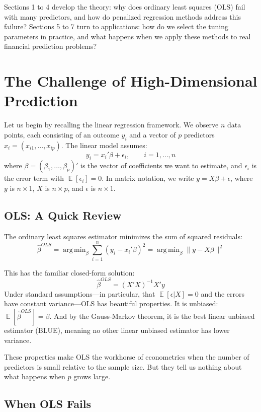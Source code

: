 \documentclass[11pt,a4paper]{article}
\DeclareMathOperator*{\argmin}{arg\,min}
\DeclareMathOperator{\E}{\mathbb{E}}
\begin{document}
Sections 1 to 4 develop the theory: why does ordinary least squares (OLS) fail with many predictors, and how do penalized regression methods address this failure? Sections 5 to 7 turn to applications: how do we select the tuning parameters in practice, and what happens when we apply these methods to real financial prediction problems?

\section{The Challenge of High-Dimensional Prediction}

Let us begin by recalling the linear regression framework. We observe $n$ data points, each consisting of an outcome $y_i$ and a vector of $p$ predictors $x_i = (x_{i1}, \ldots, x_{ip})$. The linear model assumes:
\[
y_i = x_i'\beta + \epsilon_i, \qquad i = 1, \ldots, n
\]
where $\beta = (\beta_1, \ldots, \beta_p)'$ is the vector of coefficients we want to estimate, and $\epsilon_i$ is the error term with $\E[\epsilon_i] = 0$. In matrix notation, we write $y = X\beta + \epsilon$, where $y$ is $n \times 1$, $X$ is $n \times p$, and $\epsilon$ is $n \times 1$.

\subsection{OLS: A Quick Review}

The ordinary least squares estimator minimizes the sum of squared residuals:
\[
\widehat{\beta}^{OLS} = \argmin_\beta \sum_{i=1}^n (y_i - x_i'\beta)^2 = \argmin_\beta \|y - X\beta\|^2
\]

This has the familiar closed-form solution:
\[
\widehat{\beta}^{OLS} = (X'X)^{-1}X'y
\]
Under standard assumptions---in particular, that $\E[\epsilon|X] = 0$ and the errors have constant variance---OLS has beautiful properties. It is unbiased: $\E[\widehat{\beta}^{OLS}] = \beta$. And by the Gauss-Markov theorem, it is the best linear unbiased estimator (BLUE), meaning no other linear unbiased estimator has lower variance.

These properties make OLS the workhorse of econometrics when the number of predictors is small relative to the sample size. But they tell us nothing about what happens when $p$ grows large.

\subsection{When OLS Fails}
\end{document}
